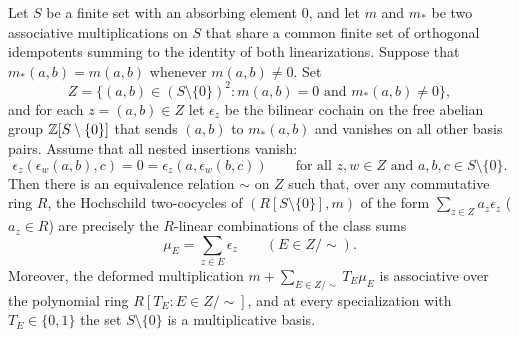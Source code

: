 \begin{lemma}
\label{lem:two-associative-tables}
Let $S$ be a finite set with an absorbing element $0$, and let $m$ and $m_*$ be two associative multiplications on $S$ that share a common finite set of orthogonal idempotents summing to the identity of both linearizations. Suppose that $m_*(a,b)=m(a,b)$ whenever $m(a,b)\ne0$. Set
\[
  Z=\{(a,b)\in(S\setminus\{0\})^2:m(a,b)=0\text{ and }m_*(a,b)\ne0\},
\]
and for each $z=(a,b)\in Z$ let $\epsilon_z$ be the bilinear cochain on the free abelian group $\mathbb Z[S\setminus\{0\}]$ that sends $(a,b)$ to $m_*(a,b)$ and vanishes on all other basis pairs. Assume that all nested insertions vanish:
\[
  \epsilon_z(\epsilon_w(a,b),c)=0=\epsilon_z(a,\epsilon_w(b,c))
  \qquad\text{for all }z,w\in Z\text{ and }a,b,c\in S\setminus\{0\}.
\]
Then there is an equivalence relation $\sim$ on $Z$ such that, over any commutative ring $R$, the Hochschild two-cocycles of $(R[S\setminus\{0\}],m)$ of the form $\sum_{z\in Z}a_z\epsilon_z$ ($a_z\in R$) are precisely the $R$-linear combinations of the class sums
\[
  \mu_E=\sum_{z\in E}\epsilon_z\qquad(E\in Z/{\sim}).
\]
Moreover, the deformed multiplication $m+\sum_{E\in Z/{\sim}}T_E\mu_E$ is associative over the polynomial ring $R[T_E:E\in Z/{\sim}]$, and at every specialization with $T_E\in\{0,1\}$ the set $S\setminus\{0\}$ is a multiplicative basis.
\end{lemma}
